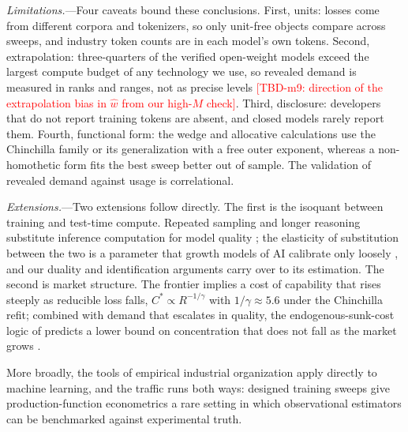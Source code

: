 \emph{Limitations.}---Four caveats bound these conclusions. First, units: losses come from different corpora and
tokenizers, so only unit-free objects compare across sweeps, and industry token counts are in each model's own
tokens. Second, extrapolation: three-quarters of the verified open-weight models exceed the largest compute
budget of any technology we use, so revealed demand is measured in ranks and ranges, not as precise levels
\textcolor{red}{[TBD-m9: direction of the extrapolation bias in $\hat w$ from our high-$M$ check]}. Third,
disclosure: developers that do not report training tokens are absent, and closed models rarely report them.
Fourth, functional form: the wedge and allocative calculations use the Chinchilla family or its generalization
with a free outer exponent, whereas a non-homothetic form fits the best sweep better out of sample. The
validation of revealed demand against usage is correlational.

\emph{Extensions.}---Two extensions follow directly. The first is the isoquant between training and test-time
compute. Repeated sampling and longer reasoning substitute inference computation for model quality
\citep{jones2021scaling,snell2024scaling,brown2024large}; the elasticity of substitution between the two is a
parameter that growth models of AI calibrate only loosely \citep{erdil2025gate}, and our duality and
identification arguments carry over to its estimation. The
second is market structure. The frontier implies a cost of capability that rises steeply as reducible loss
falls, $C^*\propto R^{-1/\gamma}$ with $1/\gamma\approx5.6$ under the Chinchilla refit; combined with demand that
escalates in quality, the endogenous-sunk-cost logic of \citet{sutton1991sunk} predicts a lower bound on
concentration that does not fall as the market grows \citep[see also][]{korinek2025concentrating}.

More broadly, the tools of empirical industrial organization apply directly to machine learning, and the
traffic runs both ways: designed training sweeps give production-function econometrics a rare setting in which
observational estimators can be benchmarked against experimental truth.
